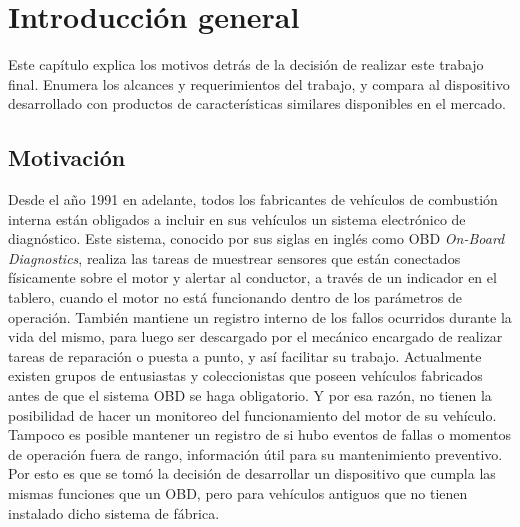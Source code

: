 \chapter{Introducción general} %

Este capítulo explica los motivos detrás de la decisión de realizar este trabajo final. 
Enumera los alcances y requerimientos del trabajo, y compara al dispositivo desarrollado con productos de características similares disponibles en el mercado.

\label{Chapter1} %
\label{IntroGeneral}


\newcommand{\keyword}[1]{\textbf{#1}}
\newcommand{\tabhead}[1]{\textbf{#1}}
\newcommand{\code}[1]{\texttt{#1}}
\newcommand{\file}[1]{\texttt{\bfseries#1}}
\newcommand{\option}[1]{\texttt{\itshape#1}}
\newcommand{\grados}{$^{\circ}$}



\section{Motivación}

Desde el año 1991 en adelante, todos los fabricantes de vehículos de combustión interna están obligados a incluir en sus vehículos un sistema electrónico de diagnóstico. Este sistema, conocido por sus siglas en inglés como OBD \textit{On-Board Diagnostics}, realiza las tareas de muestrear sensores que están conectados físicamente sobre el motor y alertar al conductor, a través de un indicador en el tablero, cuando el motor no está funcionando dentro de los parámetros de operación. También mantiene un registro interno de los fallos ocurridos durante la vida del mismo, para luego ser descargado por el mecánico encargado de realizar tareas de reparación o puesta a punto, y así facilitar su trabajo.
Actualmente existen grupos de entusiastas y coleccionistas que poseen vehículos fabricados antes de que el sistema OBD se haga obligatorio. Y por esa razón, no tienen la posibilidad de hacer un monitoreo del funcionamiento del motor de su vehículo. Tampoco es posible mantener un registro de si hubo eventos de fallas o momentos de operación fuera de rango, información útil para su mantenimiento preventivo.
Por esto es que se tomó la decisión de desarrollar un dispositivo que cumpla las mismas funciones que un OBD, pero para vehículos antiguos que no tienen instalado dicho sistema de fábrica.

